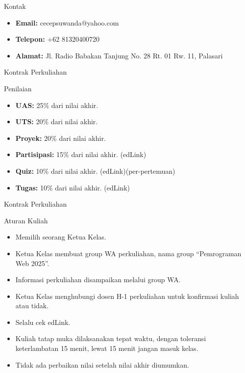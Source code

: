 \documentclass[handout]{beamer}
\begin{document}
	\begin{frame}{Kontak}
		\begin{itemize}
			\item \textbf{Email:} cecepsuwanda@yahoo.com
			\item \textbf{Telepon:} +62 81320400720
			\item \textbf{Alamat:} Jl. Radio Babakan Tanjung No. 28 Rt. 01 Rw. 11, Palasari
		\end{itemize}
	\end{frame}
	
	\begin{frame}{Kontrak Perkuliahan}
		\begin{block}{Penilaian}
			\begin{itemize}
				\item \textbf{UAS:} 25\% dari nilai akhir.
				\item \textbf{UTS:} 20\% dari nilai akhir.
				\item \textbf{Proyek:} 20\% dari nilai akhir.
				\item \textbf{Partisipasi:} 15\% dari nilai akhir.  (edLink)
				\item \textbf{Quiz:} 10\% dari nilai akhir.  (edLink)(per-pertemuan)
			    \item \textbf{Tugas:} 10\% dari nilai akhir. (edLink) 
			    
			\end{itemize}
		\end{block}
		\end{frame}
	
	\begin{frame}{Kontrak Perkuliahan}		
		\begin{block}{Aturan Kuliah}
			\begin{itemize}
				\item Memilih seorang Ketua Kelas.
				\item Ketua Kelas membuat group WA perkuliahan, nama group ``Pemrograman Web 2025''. 
				\item Informasi perkuliahan disampaikan melalui group WA.
				\item Ketua Kelas menghubungi dosen H-1 perkuliahan untuk konfirmasi kuliah atau tidak.
				\item Selalu cek edLink.
				\item Kuliah tatap muka dilaksanakan tepat waktu, dengan toleransi keterlambatan 15 menit, lewat 15 menit jangan masuk kelas.
					\item Tidak ada perbaikan nilai setelah nilai akhir diumumkan.							
			\end{itemize}
		\end{block}
	\end{frame}
\end{document}
